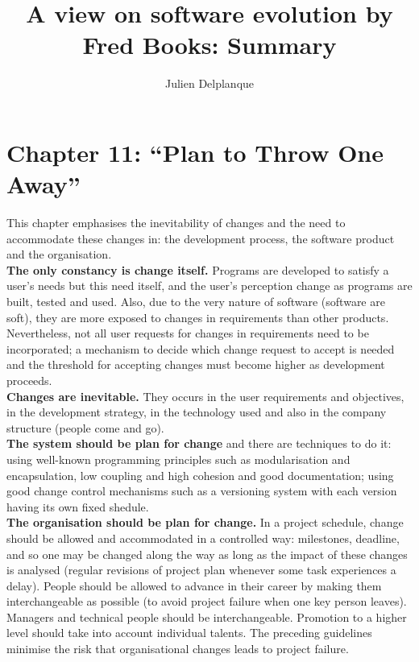 \documentclass[a4paper,11pt]{report}
\title{A view on software evolution by Fred Books: Summary}
\author{Julien Delplanque}
\begin{document}
\maketitle
\newpage

\section{Chapter 11: ``Plan to Throw One Away''}
This chapter emphasises the inevitability of changes and the need to accommodate
these changes in: the development process, the software product and the
organisation.\\

\textbf{The only constancy is change itself.}
Programs are developed to satisfy a user's needs but this need itself, and the
user's perception change as programs are built, tested and used. Also, due to
the very nature of software (software are soft), they are more exposed to
changes in requirements than other products. Nevertheless, not all user requests
for changes in requirements need to be incorporated; a mechanism to decide which
change request to accept is needed and the threshold for accepting changes must
become higher as development proceeds.\\

\textbf{Changes are inevitable.} They occurs in the user requirements and
objectives, in the development strategy, in the technology used and also in the
company structure (people come and go).\\

\textbf{The system should be plan for change} and there are techniques to do it:
using well-known programming principles such as modularisation and
encapsulation, low coupling and high cohesion and good documentation; using good
change control mechanisms such as a versioning system with each version having
its own fixed shedule.\\

\textbf{The organisation should be plan for change.} In a project schedule,
change should be allowed and accommodated in a controlled way: milestones,
deadline, and so one may be changed along the way as long as the impact of these
changes is analysed (regular revisions of project plan whenever some task
experiences a delay). People should be allowed to advance in their career by
making them interchangeable as possible (to avoid project failure when one key
person leaves). Managers and technical people should be interchangeable.
Promotion to a higher level should take into account individual talents. The
preceding guidelines minimise the risk that organisational changes leads to
project failure.\\
\end{document}
